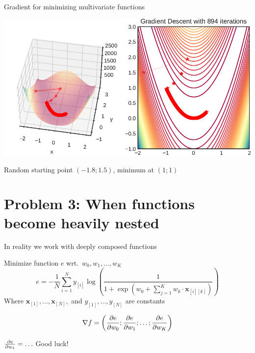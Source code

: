 \documentclass[12pt,aspectratio=169]{beamer}
\begin{document}
\begin{frame}{Gradient for minimizing multivariate functions}

\includegraphics[width=0.99\linewidth]{img/gradient1.pdf}
	

Random starting point $(-1.8; 1.5)$, minimum at $(1; 1)$

\end{frame}

\section{Problem 3: When functions become heavily nested}


\begin{frame}{In reality we work with deeply composed functions}

\begin{example}
Minimize function $e$ wrt.\ $w_0, w_1, \ldots, w_K$
$$
e = - \frac{1}{N} \sum_{i = 1}^{N} y_{[i]} \log
\left(
\frac{1}{1 +
	\exp\left( w_0 + \sum_{j=1}^{K} w_k \cdot \bm{x}_{[i][k]} \right)
}
\right)
$$
Where $\bm{x}_{[1]}, \ldots, \bm{x}_{[N]},$ and $y_{[1]}, \ldots, y_{[N]}$ are constants
\end{example}

\pause

$$
\nabla f = \left( \pdv{e}{w_0}; \pdv{e}{w_1}; \ldots; \pdv{e}{w_K} \right)
$$

$\pdv{e}{w_1} = \ldots$ \pause Good luck!
	
\end{frame}
\end{document}
